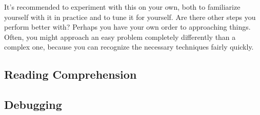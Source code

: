 It's recommended to experiment with this on your own, both to familiarize yourself with it in practice and to tune it for yourself. Are there other steps you perform better with? Perhaps you have your own order to approaching things. Often, you might approach an easy problem completely differently than a complex one, because you can recognize the necessary techniques fairly quickly.

\subsection{Reading Comprehension}
\subsection{Debugging}
